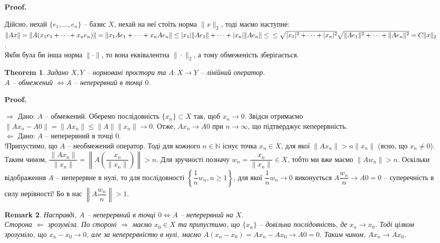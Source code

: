 \documentclass[a4paper, 10pt]{article}
\makeatletter
\def\rightproof{$\boxed{\Rightarrow}$ }
\def\leftproof{$\boxed{\Leftarrow}$ }
\theoremstyle{theoremdd}
\newtheorem{theorem}{Theorem}[subsection]
\theoremstyle{theoremdd}
\theoremstyle{theoremdd}
\theoremstyle{theoremdd}
\theoremstyle{theoremdd}
\theoremstyle{theoremdd}
\newtheorem{remark}[theorem]{Remark}
\theoremstyle{theoremdd}
\theoremstyle{theoremdd}
\renewenvironment{proof}[1][Proof.\\]{\par
\pushQED{\hfill \qed}%
\normalfont \topsep6\p@\@plus6\p@\relax
\trivlist
\item\relax
{\bfseries
#1\@addpunct{.}}\hspace\labelsep\ignorespaces
}{%
\popQED\endtrivlist\@endpefalse
}
\makeatother
\begin{document}
\begin{proof}
Дійсно, нехай $\{e_1,\dots,e_n\}$ -- базис $X$, нехай на неї стоїть норма $\|x\|_2$, тоді маємо наступне:\\
$\|Ax\| = \|A (x_1 e_1 + \dots + x_n e_n) \| = \| x_1 A e_1 + \dots + x_n A e_n \| \leq |x_1| \|A e_1 \| + \dots + |x_n| \|A e_n \| \leq \\
\leq \sqrt{|x_1|^2 + \dots + |x_n|^2} \sqrt{\|Ae_1\|^2 + \dots + \|Ae_n\|^2} = C \|x\|_2$.\\
Якби була би інша норма $\| \cdot \|$, то вона еквівалентна $\| \cdot \|_2$, а тому обмеженість зберігається.
\end{proof}

\begin{theorem}
Задано $X,Y$ -- нормовані простори та $A \colon X \to Y$ -- лінійний оператор.\\
$A$ -- обмежений $\iff A $ -- неперервний в точці $0$.
\end{theorem}

\begin{proof}
\rightproof Дано: $A$ -- обмежений. Оберемо послідовність $\{x_n\} \subset X$ так, щоб $x_n \to 0$. Звідси отримаємо $\|Ax_n - A0\| = \|Ax_n\| \leq \|A\| \|x_n\| \to 0$. Отже, $Ax_n \to A0$ при $n \to \infty$, що підтверджує неперервність. 
\bigskip \\
\leftproof Дано: $A$ -- неперервний в точці $0$.\\
!Припустимо, що $A$ -- необмежений оператор. Тоді для кожного $n \in \mathbb{N}$ існує точка $x_n \in X$, для якої $\|Ax_n\| > n \|x_n\|$ (ясно, що $x_n \neq 0$).  Таким чином, $\dfrac{\|Ax_n\|}{\|x_n\|} = \left\| A\left( \dfrac{x_n}{\|x_n\|} \right) \right\| > n$. Для зручності позначу $w_n = \dfrac{x_n}{\|x_n\|} \in X$, тобто ми вже маємо $\| Aw_n\| > n$. Оскільки відображення $A$ -- неперервне в нулі, то для послідовності $\left\{ \dfrac{1}{n}w_n, n \geq 1 \right\}$, для якої $\dfrac{1}{n} w_n \to 0$ виконується $A \dfrac{w_n}{n} \to A0 = 0$ -- суперечність в силу нерівності! Бо в нас $\left\| A \dfrac{w_n}{n} \right\| > 1$.
\end{proof}

\begin{remark}
Насправді, $A$ -- неперервний в точці $0 \iff A$ -- неперервний на $X$.\\
Сторона \leftproof зрозуміла. По стороні \rightproof маємо $x_0 \in X$ та припустимо, що $\{x_n\}$ -- довільна послідовність, де $x_n \to x_0$. Тоді цілком зрозуміло, що $x_n - x_0 \to 0$, але за неперервністю в нулі, маємо $A(x_n - x_0) = A x_n - A x_0 \to A0 = 0$. Таким чином, $A x_n \to A x_0$.
\end{remark}
\end{document}
